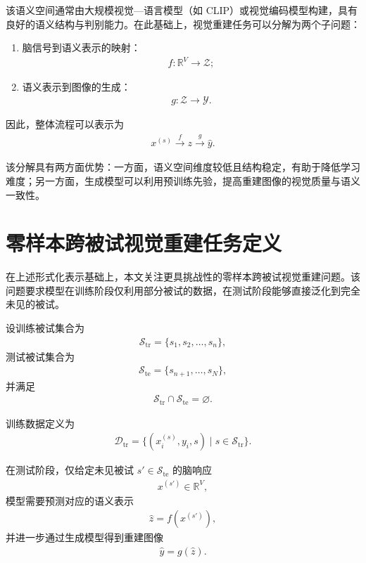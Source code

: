该语义空间通常由大规模视觉—语言模型（如 CLIP）或视觉编码模型构建，具有良好的语义结构与判别能力。在此基础上，视觉重建任务可以分解为两个子问题：

\begin{enumerate}
  \item 脑信号到语义表示的映射：
  \begin{align}
    f: \mathbb{R}^{V} \rightarrow \mathcal{Z};
  \end{align}
  \item 语义表示到图像的生成：
  \begin{align}
    g: \mathcal{Z} \rightarrow \mathcal{Y}.
  \end{align}
\end{enumerate}

因此，整体流程可以表示为
\begin{align}
  x^{(s)} \xrightarrow{\ f\ } z \xrightarrow{\ g\ } \hat{y}.
\end{align}

该分解具有两方面优势：一方面，语义空间维度较低且结构稳定，有助于降低学习难度；另一方面，生成模型可以利用预训练先验，提高重建图像的视觉质量与语义一致性。

\section{零样本跨被试视觉重建任务定义}

在上述形式化表示基础上，本文关注更具挑战性的零样本跨被试视觉重建问题。该问题要求模型在训练阶段仅利用部分被试的数据，在测试阶段能够直接泛化到完全未见的被试。

设训练被试集合为
\begin{align}
  \mathcal{S}_{\mathrm{tr}} = \{s_1,s_2,\dots,s_n\},
\end{align}
测试被试集合为
\begin{align}
  \mathcal{S}_{\mathrm{te}} = \{s_{n+1},\dots,s_N\},
\end{align}
并满足
\begin{align}
  \mathcal{S}_{\mathrm{tr}} \cap \mathcal{S}_{\mathrm{te}} = \varnothing.
\end{align}

训练数据定义为
\begin{align}
  \mathcal{D}_{\mathrm{tr}} = \{(x_i^{(s)}, y_i, s) \mid s \in \mathcal{S}_{\mathrm{tr}}\}.
\end{align}

在测试阶段，仅给定未见被试 $s' \in \mathcal{S}_{\mathrm{te}}$ 的脑响应
\begin{align}
  x^{(s')} \in \mathbb{R}^{V},
\end{align}
模型需要预测对应的语义表示
\begin{align}
  \hat{z} = f(x^{(s')}),
\end{align}
并进一步通过生成模型得到重建图像
\begin{align}
  \hat{y} = g(\hat{z}).
\end{align}

